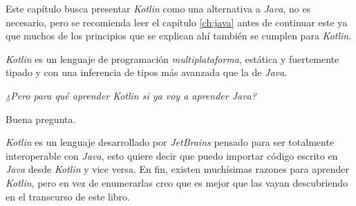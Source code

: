 Este capítulo busca presentar \textit{Kotlin} como una alternativa a \textit{Java}, no es
necesario, pero se recomienda leer el capítulo \ref{ch:java} antes de continuar este ya que
muchos de los principios que se explican ahí también se cumplen para \textit{Kotlin}.

\textit{Kotlin} es un lenguaje de programación \textit{multiplataforma}, estática y fuertemente
tipado y con una inferencia de tipos más avanzada que la de \textit{Java}.

\begin{center}
  \textit{¿Pero para qué aprender Kotlin si ya voy a aprender Java?}
\end{center}

Buena pregunta.
\vfill

\textit{Kotlin} es un lenguaje desarrollado por \textit{JetBrains} pensado para ser totalmente 
interoperable con \textit{Java}, esto quiere decir que puedo importar código escrito en 
\textit{Java} desde \textit{Kotlin} y vice versa.
En fin, existen muchísimas razones para aprender \textit{Kotlin}, pero en vez de enumerarlas creo
que es mejor que las vayan descubriendo en el transcurso de este libro.
